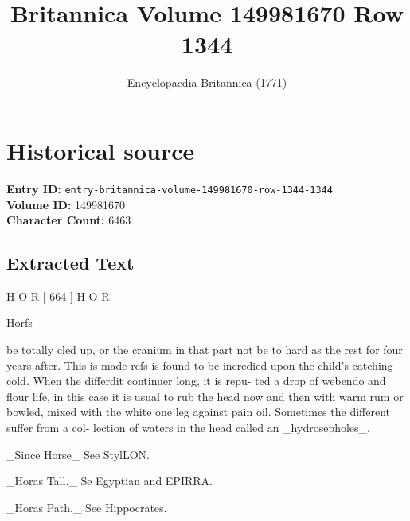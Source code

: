 \documentclass{article}
\title{Britannica Volume 149981670 Row 1344}
\date{Encyclopaedia Britannica (1771)}
\begin{document}
\maketitle

\section*{Historical source}
\textbf{Entry ID:} \texttt{entry-britannica-volume-149981670-row-1344-1344} \\
\textbf{Volume ID:} 149981670 \\
\textbf{Character Count:} 6463

\subsection*{Extracted Text}
H O R [ 664 ] H O R

Horfs

be totally cled up, or the cranium in that part not be
to hard as the rest for four years after. This is made
refs is found to be incredied upon the child’s catching
cold. When the differdit continuer long, it is repu-
ted a drop of webendo and flour life, in this case
it is usual to rub the head now and then with warm
rum or bowled, mixed with the white one leg against
pain oil. Sometimes the different suffer from a col-
lection of waters in the head called an \_hydrosepholes\_.

\_Since Horse\_ See StylLON.

\_Horas Tall.\_ Se Egyptian and EPIRRA.

\_Horas Path.\_ See Hippocrates.
\end{document}
